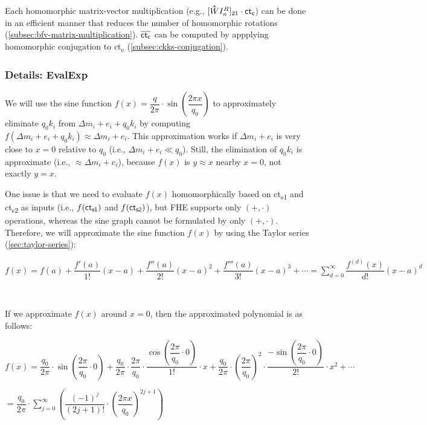 Each homomorphic matrix-vector multiplication (e.g., $[\hathat WI_n^R]_{21} \cdot \textsf{ct\textsubscript{c}}$) can be done in an efficient manner that reduces the number of homomorphic rotations (\autoref{subsec:bfv-matrix-multiplication}). $\mathit{\overline{\textsf{ct\textsubscript{c}}}}$ can be computed by appplying homomorphic conjugation to \textsf{ct\textsubscript{c}} (\autoref{subsec:ckks-conjugation}).



\subsubsection{Details: \textsf{EvalExp}}
\label{subsubsec:ckks-bootstrapping-evalexp-details}

We will use the sine function $f(x) = \dfrac{q}{2\pi}\cdot \sin\left(\dfrac{2\pi x}{q_0}\right)$ to approximately eliminate $q_0k_i$ from $\Delta m_i + e_i + q_0k_i$ by computing $f(\Delta m_i + e_i + q_0k_i) \approx \Delta m_i + e_i$. This approximation works if $\Delta m_i + e_i$ is very close to $x=0$ relative to $q_0$ (i.e., $\Delta m_i + e_i \ll q_0$). Still, the elimination of $q_0k_i$ is approximate (i.e., $\approx \Delta m_i + e_i$), because $f(x)$ is $y \approx x$ nearby $x=0$, not exactly $y = x$. 

One issue is that we need to evaluate $f(x)$ homomorphically based on \textsf{ct\textsubscript{s1}} and \textsf{ct\textsubscript{s2}} as inputs (i.e., $f(\textsf{ct\textsubscript{s1}})$ and $f(\textsf{ct\textsubscript{s2}})$), but FHE supports only $(+, \cdot)$ operations, whereas the sine graph cannot be formulated by only $(+, \cdot)$. Therefore, we will approximate the sine function $f(x)$ by using the Taylor series (\autoref{sec:taylor-series}): 

$f(x) = f(a) + \dfrac{f'(a)}{1!}(x-a) + \dfrac{f''(a)}{2!}(x-a)^2 + \dfrac{f'''(a)}{3!}(x-a)^3 + \cdots = \sum\limits_{d=0}^{\infty}\dfrac{f^{(d)}(x)}{d!}(x-a)^d$ 

$ $

If we approximate $f(x)$ around $x = 0$, then the approximated polynomial is as follows: 

$f(x) = \dfrac{q_0}{2\pi}\cdot \sin\left(\dfrac{2\pi}{q_0}\cdot 0\right) + \dfrac{q_0}{2\pi}\cdot\dfrac{2\pi}{q_0}\cdot\dfrac{\cos\left(\dfrac{2\pi}{q_0} \cdot 0\right)}{1!}\cdot x + \dfrac{q_0}{2\pi}\cdot \left(\dfrac{2\pi}{q_0}\right)^{2}\cdot\dfrac{-\sin\left(\dfrac{2\pi}{q_0} \cdot 0\right)}{2!}\cdot x^2 + \cdots$

$ = \dfrac{q_0}{2\pi}\cdot \sum\limits_{j=0}^{\infty}\left(\dfrac{(-1)^j}{(2j + 1)!}\cdot \left(\dfrac{2\pi x}{q_0}\right)^{2j + 1}\right)$

